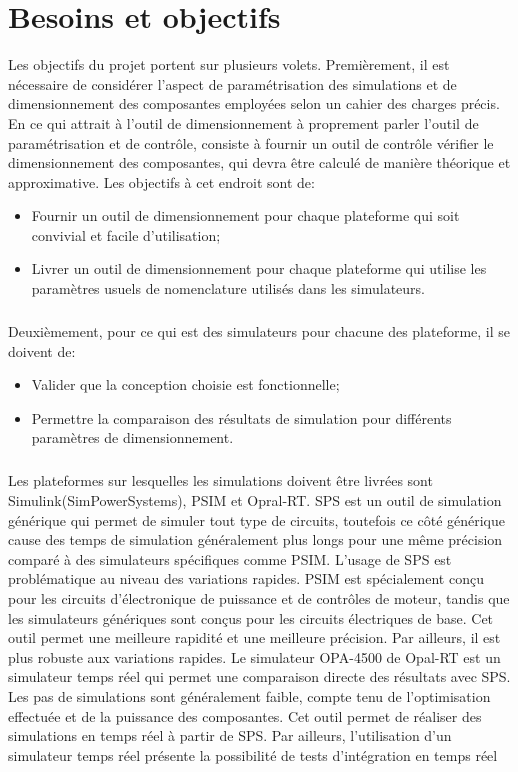 \chapter{Besoins et objectifs}
Les objectifs du projet portent sur plusieurs volets. Premièrement, il est nécessaire de considérer l'aspect de paramétrisation des simulations et de dimensionnement des composantes employées selon un cahier des charges précis. En ce qui attrait à l'outil de dimensionnement à proprement parler l'outil de paramétrisation et de contrôle, consiste à fournir un outil de contrôle vérifier le dimensionnement des composantes, qui devra être calculé de manière théorique et approximative. Les objectifs à cet endroit sont de:

\begin{itemize}
\item Fournir un outil de dimensionnement pour chaque plateforme qui soit convivial et facile d'utilisation;
\item Livrer un outil de dimensionnement pour chaque plateforme qui utilise les paramètres usuels de nomenclature utilisés dans les simulateurs.
\end{itemize}

\paragraph{}Deuxièmement, pour ce qui est des simulateurs pour chacune des plateforme, il se doivent de:
\begin{itemize}
\item Valider que la conception choisie est fonctionnelle;
\item Permettre la comparaison des résultats de simulation pour différents paramètres de dimensionnement.
\end{itemize}
\paragraph{}Les plateformes sur lesquelles les simulations doivent être livrées sont Simulink(SimPowerSystems), PSIM et Opral-RT. SPS est un outil de simulation générique qui permet de simuler tout type de circuits, toutefois ce côté générique cause des temps de simulation généralement plus longs pour une même précision comparé à des simulateurs spécifiques comme PSIM. L'usage de SPS est problématique au niveau des variations rapides. PSIM est spécialement conçu pour les circuits d'électronique de puissance et de contrôles de moteur, tandis que les simulateurs génériques sont conçus pour les circuits électriques de base. Cet outil permet une meilleure rapidité et une meilleure précision. Par ailleurs, il est plus robuste aux variations rapides. Le simulateur OPA-4500 de Opal-RT est un simulateur temps réel qui permet une comparaison directe des résultats avec SPS. Les pas de simulations sont généralement faible, compte tenu de l'optimisation effectuée et de la puissance des composantes. Cet outil permet de réaliser des simulations en temps réel à partir de SPS. Par ailleurs, l'utilisation d'un simulateur temps réel présente la possibilité de tests d'intégration en temps réel

